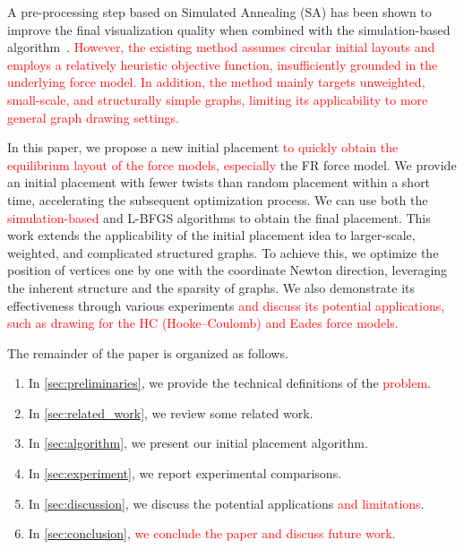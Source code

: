 \documentclass[11pt]{article}
\newcommand{\red}[1]{\textcolor{red}{#1}}
\begin{document}
A pre-processing step based on Simulated Annealing (SA) has been shown to improve the final visualization quality when combined with the simulation-based algorithm~\cite{ghassemitoosiSimulatedAnnealingPreProcessing2016}.
\red{However, the existing method assumes circular initial layouts and employs a relatively heuristic objective function, insufficiently grounded in the underlying force model.
  In addition, the method mainly targets unweighted, small-scale, and structurally simple graphs, limiting its applicability to more general graph drawing settings.}

In this paper, we propose a new initial placement \red{to quickly obtain the equilibrium layout of the force models, especially} the FR force model.
We provide an initial placement with fewer twists than random placement within a short time, accelerating the subsequent optimization process.
We can use both the \red{simulation-based} and L-BFGS algorithms to obtain the final placement.
This work extends the applicability of the initial placement idea to larger-scale, weighted, and complicated structured graphs.
To achieve this, we optimize the position of vertices one by one with the coordinate Newton direction, leveraging the inherent structure and the sparsity of graphs.
We also demonstrate its effectiveness through various experiments \red{and discuss its potential applications, such as drawing for the HC (Hooke--Coulomb) \citep{atallahAlgorithmsTheoryComputation2009} and Eades \citep{eades1984heuristic} force models.}

The remainder of the paper is organized as follows.
\begin{enumerate}[label=\textbullet, itemsep=0pt, parsep=0pt]
  \item In \cref{sec:preliminaries}, we provide the technical definitions of the \red{problem}.

  \item In \cref{sec:related_work}, we review some related work.

  \item In \cref{sec:algorithm}, we present our initial placement algorithm.

  \item In \cref{sec:experiment}, we report experimental comparisons.

  \item In \cref{sec:discussion}, we discuss the potential applications \red{and limitations}.

  \item In \cref{sec:conclusion}, \red{we conclude the paper and discuss future work.}
\end{enumerate}
\end{document}
